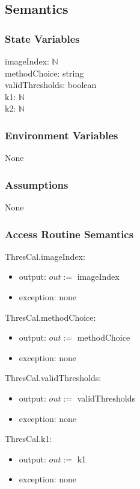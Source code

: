 \documentclass[12pt, titlepage]{article}
\begin{document}
\subsection{Semantics}

\subsubsection{State Variables}

imageIndex: $\mathbb{N}$\\
methodChoice: string\\
validThresholds: boolean\\
k1: $\mathbb{N}$\\
k2: $\mathbb{N}$

\subsubsection{Environment Variables}

None

\subsubsection{Assumptions}

None

\subsubsection{Access Routine Semantics}

\noindent ThresCal.imageIndex:
\begin{itemize}
\item output: $out :=$ imageIndex
\item exception: none 
\end{itemize}

\noindent ThresCal.methodChoice:
\begin{itemize}
\item output: $out :=$ methodChoice
\item exception: none 
\end{itemize}

\noindent ThresCal.validThresholds:
\begin{itemize}
\item output: $out :=$ validThresholds
\item exception: none 
\end{itemize}

\noindent ThresCal.k1:
\begin{itemize}
\item output: $out :=$ k1
\item exception: none 
\end{itemize}
\end{document}
